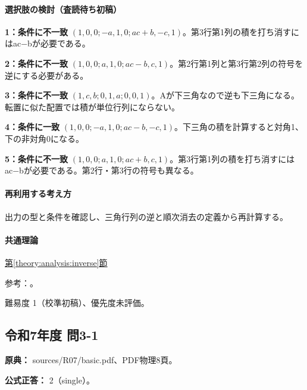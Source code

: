 \paragraph{選択肢の検討（査読待ち初稿）}\mbox{}\par

\noindent\textbf{1：条件に不一致} \((1,0,0;-a,1,0;ac+b,-c,1)\)。第3行第1列の積を打ち消すにはac−bが必要である。\par

\noindent\textbf{2：条件に不一致} \((1,0,0;a,1,0;ac-b,c,1)\)。第2行第1列と第3行第2列の符号を逆にする必要がある。\par

\noindent\textbf{3：条件に不一致} \((1,c,b;0,1,a;0,0,1)\)。Aが下三角なので逆も下三角になる。転置に似た配置では積が単位行列にならない。\par

\noindent\textbf{4：条件に一致} \((1,0,0;-a,1,0;ac-b,-c,1)\)。下三角の積を計算すると対角1、下の非対角0になる。\par

\noindent\textbf{5：条件に不一致} \((1,0,0;a,1,0;ac+b,c,1)\)。第3行第1列の積を打ち消すにはac−bが必要である。第2行・第3行の符号も異なる。\par

\paragraph{再利用する考え方} 出力の型と条件を確認し、三角行列の逆と順次消去の定義から再計算する。

\paragraph{共通理論} \hyperref[theory:analysis:inverse]{第\ref*{theory:analysis:inverse}節}

\par 参考：\cite{mit_inverse2007}。

\par 難易度 1（校準初稿）、優先度未評価。

\subsection{令和7年度 問3-1}
\label{q:r07-reg-basic-3-1}

\noindent\textbf{原典：} sources/R07/basic.pdf、PDF物理8頁。

\textbf{公式正答：} 2（single）。

